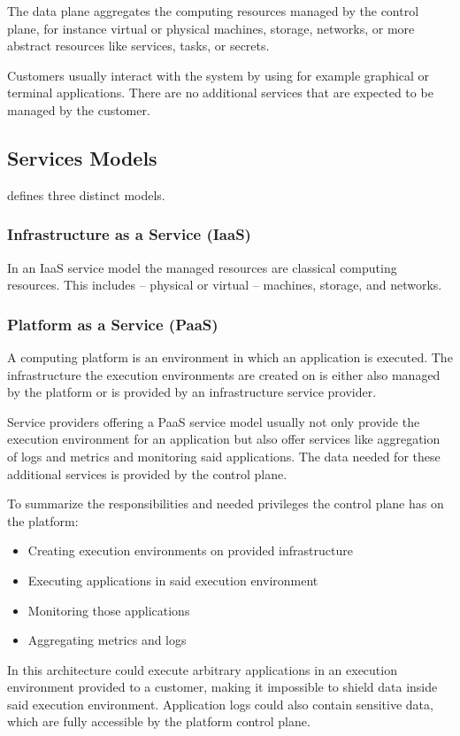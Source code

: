 The data plane aggregates the computing resources managed by the control plane,
for instance virtual or physical machines, storage, networks, or more abstract
resources like services, tasks, or secrets.

Customers usually interact with the system by using for example graphical or
terminal applications. There are no additional services that are expected to be
managed by the customer.

\subsection{Services Models}

 \cite{mell2011} defines three distinct models.

\subsubsection{Infrastructure as a Service (IaaS)}

In an IaaS service model the managed resources are classical computing
resources. This includes -- physical or virtual -- machines, storage, and
networks.

\subsubsection{Platform as a Service (PaaS)}

A computing platform is an environment in which an application is executed.
The infrastructure the execution environments are created on is either also
managed by the platform or is provided by an infrastructure service provider.

Service providers offering a PaaS service model usually not only provide the
execution environment for an application but also offer services like
aggregation of logs and metrics and monitoring said applications. The data
needed for these additional services is provided by the control plane.

To summarize the responsibilities and needed privileges the control plane has on
the platform:

\begin{itemize}
  \item Creating execution environments on provided infrastructure
  \item Executing applications in said execution environment
  \item Monitoring those applications
  \item Aggregating metrics and logs
\end{itemize}

In this architecture could execute arbitrary applications in an execution
environment provided to a customer, making it impossible to shield data inside
said execution environment. Application logs could also contain sensitive data,
which are fully accessible by the platform control plane.


